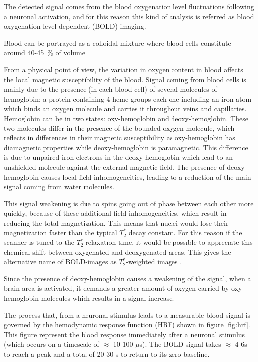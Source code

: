 \documentclass[11pt]{report}
\begin{document}
The detected signal comes from the blood oxygenation level fluctuations following a neuronal activation, and for this reason this kind of analysis is referred as blood oxygenation level-dependent (BOLD) imaging.

Blood can be portrayed as a colloidal mixture where blood cells constitute around 40-45~\% of volume. \cite{brown-2014}

From a physical point of view, the variation in oxygen content in blood affects the local magnetic susceptibility of the blood.
Signal coming from blood cells is mainly due to the presence (in each blood cell) of several molecules of hemoglobin: a protein containing 4 heme groups each one including an iron atom which binds an oxygen molecule and carries it throughout veins and capillaries.
Hemoglobin can be in two states: oxy-hemoglobin and deoxy-hemoglobin.
These two molecules differ in the presence of the bounded oxygen molecule, which reflects in differences in their magnetic susceptibility as oxy-hemoglobin has diamagnetic properties while deoxy-hemoglobin is paramagnetic.
This difference is due to unpaired iron electrons in the deoxy-hemoglobin which lead to an unshielded molecule against the external magnetic field.
The presence of deoxy-hemoglobin causes local field inhomogeneities, leading to a reduction of the main signal coming from water molecules.

This signal weakening is due to spins going out of phase between each other more quickly, because of these additional field inhomogeneities, which result in reducing the total magnetization.
This means that nuclei would lose their magnetization faster than the typical $T_2^*$ decay constant.
For this reason if the scanner is tuned to the $T_2^*$ relaxation time, it would be possible to appreciate this chemical shift between oxygenated and deoxygenated areas. This gives the alternative name of BOLD-images as $T_2^{\ast}$-weighted images \cite{huettel-2009}.

Since the presence of deoxy-hemoglobin causes a weakening of the signal, when a brain area is activated, it demands a greater amount of oxygen carried by oxy-hemoglobin molecules which results in a signal increase.

The process that, from a neuronal stimulus leads to a measurable blood signal is governed by the hemodynamic response function (HRF) shown in figure \ref{fig:hrf}. This figure represent the blood response immediately after a neuronal stimulus (which occurs on a timescale of $\approx$ 10-100 $\mu$s). The BOLD signal takes $\approx$ 4-6s to reach a peak and a total of 20-30 s to return to its zero baseline.
\end{document}
